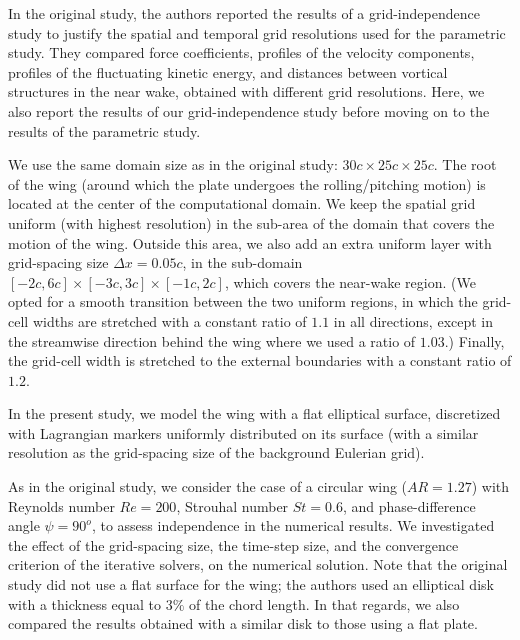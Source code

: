 In the original study, the authors reported the results of a grid-independence study to justify the spatial and temporal grid resolutions used for the parametric study.
They compared force coefficients, profiles of the velocity components, profiles of the fluctuating kinetic energy, and distances between vortical structures in the near wake, obtained with different grid resolutions.
Here, we also report the results of our grid-independence study before moving on to the results of the parametric study.

We use the same domain size as in the original study: $30c \times 25c \times 25c$.
The root of the wing (around which the plate undergoes the rolling/pitching motion) is located at the center of the computational domain.
We keep the spatial grid uniform (with highest resolution) in the sub-area of the domain that covers the motion of the wing.
Outside this area, we also add an extra uniform layer with grid-spacing size $\Delta x = 0.05c$, in the sub-domain $\left[ -2c, 6c \right] \times \left[ -3c, 3c \right] \times \left[ -1c, 2c \right]$, which covers the near-wake region.
(We opted for a smooth transition between the two uniform regions, in which the grid-cell widths are stretched with a constant ratio of $1.1$ in all directions, except in the streamwise direction behind the wing where we used a ratio of $1.03$.)
Finally, the grid-cell width is stretched to the external boundaries with a constant ratio of $1.2$.

In the present study, we model the wing with a flat elliptical surface, discretized with Lagrangian markers uniformly distributed on its surface (with a similar resolution as the grid-spacing size of the background Eulerian grid).

As in the original study, we consider the case of a circular wing ($AR = 1.27$) with Reynolds number $Re = 200$, Strouhal number $St = 0.6$, and phase-difference angle $\psi = 90^o$, to assess independence in the numerical results.
We investigated the effect of the grid-spacing size, the time-step size, and the convergence criterion of the iterative solvers, on the numerical solution.
Note that the original study did not use a flat surface for the wing; the authors used an elliptical disk with a thickness equal to $3\%$ of the chord length.
In that regards, we also compared the results obtained with a similar disk to those using a flat plate.

